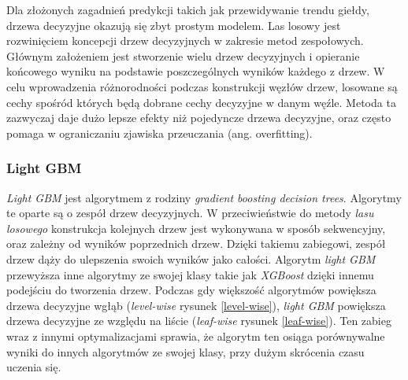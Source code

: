 \documentclass[a4paper, twoside, 11pt, openright]{article}
\begin{document}
Dla złożonych zagadnień predykcji takich jak przewidywanie trendu giełdy, drzewa decyzyjne okazują się zbyt prostym modelem. Las losowy jest rozwinięciem koncepcji drzew decyzyjnych w zakresie metod zespołowych. Głównym założeniem jest stworzenie wielu drzew decyzyjnych i opieranie końcowego wyniku na podstawie poszczególnych wyników każdego z drzew. W celu wprowadzenia różnorodności podczas konstrukcji węzłów drzew, losowane są cechy spośród których będą dobrane cechy decyzyjne w danym węźle. Metoda ta zazwyczaj daje dużo lepsze efekty niż pojedyncze drzewa decyzyjne, oraz często pomaga w ograniczaniu zjawiska przeuczania (ang. overfitting).  

\subsubsection{Light GBM \cite{lgbm}}

\textit{Light GBM} jest algorytmem z rodziny \textit{gradient boosting decision trees}. Algorytmy te oparte są o zespół drzew decyzyjnych. W przeciwieństwie do metody \textit{lasu losowego} konstrukcja kolejnych drzew jest wykonywana w sposób sekwencyjny, oraz zależny od wyników poprzednich drzew. Dzięki takiemu zabiegowi, zespół drzew dąży do ulepszenia swoich wyników jako całości. Algorytm \textit{light GBM} przewyższa inne algorytmy ze swojej klasy takie jak \textit{XGBoost} dzięki innemu podejściu do tworzenia drzew. Podczas gdy większość algorytmów powiększa drzewa decyzyjne wgłąb (\textit{level-wise}  rysunek \ref{level-wise}), \textit{light GBM} powiększa drzewa decyzyjne ze względu na liście (\textit{leaf-wise} rysunek \ref{leaf-wise}). Ten zabieg wraz z innymi optymalizacjami sprawia, że algorytm ten osiąga porównywalne wyniki do innych algorytmów ze swojej klasy, przy dużym skrócenia czasu uczenia się. 
\end{document}
